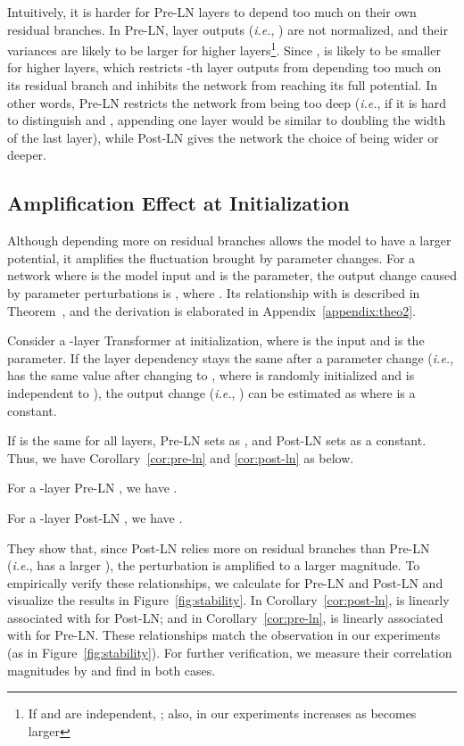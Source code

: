 \documentclass[11pt,a4paper]{article}
\newcommand{\ie}{\textit{i.e.}}
\begin{document}
Intuitively, it is harder for Pre-LN layers to depend too much on their own residual branches.
In Pre-LN, layer outputs (\ie, ) are not normalized, and their variances are likely to be larger for higher layers\footnote{If  and  are independent, ; also, in our experiments  increases as  becomes larger}.
Since ,  is likely to be smaller for higher layers, which restricts -th layer outputs from depending too much on its residual branch and inhibits the network from reaching its full potential.
In other words, Pre-LN restricts the network from being too deep 
(\ie, if it is hard to distinguish  and ,
appending one layer would be similar to doubling the width of the last layer), 
while Post-LN gives the network the choice of being wider or deeper.


\subsection{Amplification Effect at Initialization}

Although depending more on residual branches allows the model to have a larger potential, it amplifies the fluctuation brought by parameter changes. 
For a network  where  is the model input and  is the parameter, 
the output change caused by parameter perturbations is , where . 
Its relationship with  is described in Theorem~, and the derivation is elaborated in Appendix~\ref{appendix:theo2}. 
\begin{theorem}
Consider a -layer Transformer  at initialization, where  is the input and  is the parameter. 
If the layer dependency stays the same after a parameter change 
(\ie,  has the same value after changing  to , where  is randomly initialized and  is independent to ), the output change (\ie, ) can be estimated as  where  is a constant.
\label{theo:layer-dependency-and-shift}
\end{theorem}
If  is the same for all layers, Pre-LN sets  as , and Post-LN sets  as a constant.
Thus, we have Corollary~\ref{cor:pre-ln} and \ref{cor:post-ln} as below.
\begin{corollary}
For a -layer Pre-LN , we have .
\label{cor:pre-ln}
\end{corollary}
\begin{corollary}
For a -layer Post-LN , we have .
\label{cor:post-ln}
\end{corollary}
They show that, since Post-LN relies more on residual branches than Pre-LN (\ie, has a larger ), the perturbation is amplified to a larger magnitude. 
To empirically verify these relationships, we calculate  for Pre-LN and Post-LN and visualize the results in Figure~\ref{fig:stability}. 
In Corollary~\ref{cor:post-ln},  is linearly associated with   for Post-LN; and in Corollary~\ref{cor:pre-ln},  is linearly associated with 
 for Pre-LN.
These relationships match the observation in our experiments (as in Figure~\ref{fig:stability}).
For further verification, we measure their correlation magnitudes by  and find  in both cases. 
\end{document}
